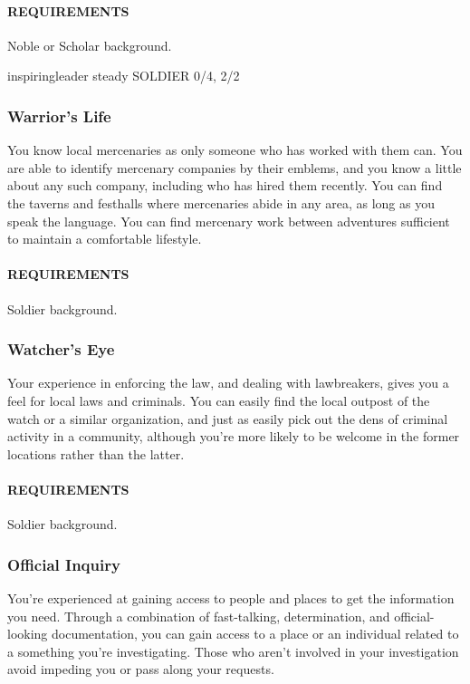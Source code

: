         \paragraph{REQUIREMENTS} Noble or Scholar background.

inspiringleader steady
SOLDIER 0/4, 2/2
    \subsubsection{Warrior's Life} \label{feat::warriorslife}
        You know local mercenaries as only someone who has worked with them can.
        You are able to identify mercenary companies by their emblems, and you know a little about any such company, including who has hired them recently.
        You can find the taverns and festhalls where mercenaries abide in any area, as long as you speak the language.
        You can find mercenary work between adventures sufficient to maintain a comfortable lifestyle.
        \paragraph{REQUIREMENTS} Soldier background.

    \subsubsection{Watcher's Eye} \label{feat::watcherseye}
        Your experience in enforcing the law, and dealing with lawbreakers, gives you a feel for local laws and criminals.
        You can easily find the local outpost of the watch or a similar organization, and just as easily pick out the dens of criminal activity in a community, although you're more likely to be welcome in the former locations rather than the latter.
        \paragraph{REQUIREMENTS} Soldier background.

    \subsubsection{Official Inquiry} \label{feat::officialinquiry}
        You're experienced at gaining access to people and places to get the information you need.
        Through a combination of fast-talking, determination, and official-looking documentation, you can gain access to a place or an individual related to a something you're investigating.
        Those who aren't involved in your investigation avoid impeding you or pass along your requests.

